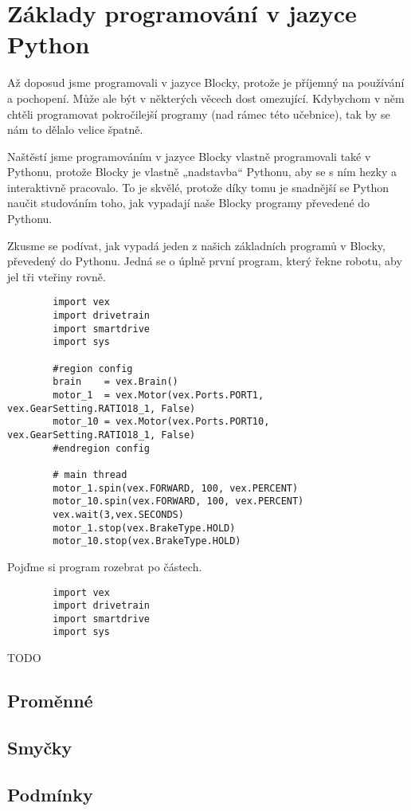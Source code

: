 \documentclass[../main.tex]{subfiles}
\begin{document}
	\section{Základy programování v jazyce Python}
	Až doposud jsme programovali v jazyce Blocky, protože je příjemný na používání a pochopení. Může ale být v některých věcech dost omezující. Kdybychom v něm chtěli programovat pokročilejší programy (nad rámec této učebnice), tak by se nám to dělalo velice špatně.

	Naštěstí jsme programováním v jazyce Blocky vlastně programovali také v Pythonu, protože Blocky je vlastně „nadstavba“ Pythonu, aby se s ním hezky a interaktivně pracovalo. To je skvělé, protože díky tomu je snadnější se Python naučit studováním toho, jak vypadají naše Blocky programy převedené do Pythonu.

	Zkusme se podívat, jak vypadá jeden z našich základních programů v Blocky, převedený do Pythonu. Jedná se o úplně první program, který řekne robotu, aby jel tři vteřiny rovně.

	\begin{verbatim}
		import vex
		import drivetrain
		import smartdrive
		import sys
		
		#region config
		brain    = vex.Brain()
		motor_1  = vex.Motor(vex.Ports.PORT1, vex.GearSetting.RATIO18_1, False)
		motor_10 = vex.Motor(vex.Ports.PORT10, vex.GearSetting.RATIO18_1, False)
		#endregion config
		
		# main thread
		motor_1.spin(vex.FORWARD, 100, vex.PERCENT)
		motor_10.spin(vex.FORWARD, 100, vex.PERCENT)
		vex.wait(3,vex.SECONDS)
		motor_1.stop(vex.BrakeType.HOLD)
		motor_10.stop(vex.BrakeType.HOLD)	
	\end{verbatim}

	Pojďme si program rozebrat po částech.

	\begin{verbatim}
		import vex
		import drivetrain
		import smartdrive
		import sys
	\end{verbatim}

	TODO


	\subsection{Proměnné}

	\subsection{Smyčky}

	\subsection{Podmínky}
\end{document}
